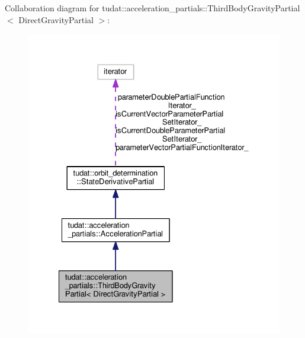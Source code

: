 Collaboration diagram for tudat\+:\+:acceleration\+\_\+partials\+:\+:Third\+Body\+Gravity\+Partial$<$ Direct\+Gravity\+Partial $>$\+:
\nopagebreak
\begin{figure}[H]
\begin{center}
\leavevmode
\includegraphics[width=328pt]{classtudat_1_1acceleration__partials_1_1ThirdBodyGravityPartial__coll__graph}
\end{center}
\end{figure}
